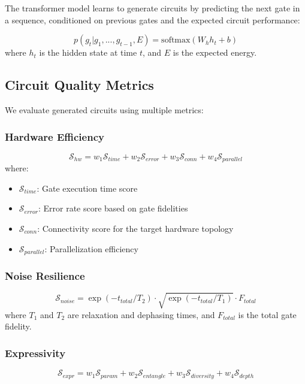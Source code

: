 \documentclass[11pt,a4paper,uplatex,dvipdfmx]{jsarticle}
\begin{document}
The transformer model learns to generate circuits by predicting the next gate in a sequence, conditioned on previous gates and the expected circuit performance:

\begin{equation}
    p(g_t | g_1, ..., g_{t-1}, E) = \text{softmax}(W_h h_t + b)
\end{equation}
where $h_t$ is the hidden state at time $t$, and $E$ is the expected energy.

\subsection{Circuit Quality Metrics}

We evaluate generated circuits using multiple metrics:

\subsubsection{Hardware Efficiency}
\begin{equation}
    \mathcal{S}_{hw} = w_1 \mathcal{S}_{time} + w_2 \mathcal{S}_{error} + w_3 \mathcal{S}_{conn} + w_4 \mathcal{S}_{parallel}
\end{equation}
where:
\begin{itemize}
    \item $\mathcal{S}_{time}$: Gate execution time score
    \item $\mathcal{S}_{error}$: Error rate score based on gate fidelities
    \item $\mathcal{S}_{conn}$: Connectivity score for the target hardware topology
    \item $\mathcal{S}_{parallel}$: Parallelization efficiency
\end{itemize}

\subsubsection{Noise Resilience}
\begin{equation}
    \mathcal{S}_{noise} = \exp(-t_{total}/T_2) \cdot \sqrt{\exp(-t_{total}/T_1)} \cdot F_{total}
\end{equation}
where $T_1$ and $T_2$ are relaxation and dephasing times, and $F_{total}$ is the total gate fidelity.

\subsubsection{Expressivity}
\begin{equation}
    \mathcal{S}_{expr} = w_1 \mathcal{S}_{param} + w_2 \mathcal{S}_{entangle} + w_3 \mathcal{S}_{diversity} + w_4 \mathcal{S}_{depth}
\end{equation}
\end{document}
